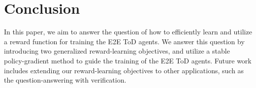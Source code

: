 \vspace{-.5em}
\section{Conclusion}
\vspace{-.5em}
In this paper, we aim to answer the question of how to efficiently learn and utilize a reward function for training the E2E ToD agents. 
We answer this question by introducing two generalized reward-learning objectives, and utilize a stable policy-gradient method to guide the training of the E2E ToD agents. 
Future work includes extending our reward-learning objectives to other applications, such as the question-answering with verification. 
